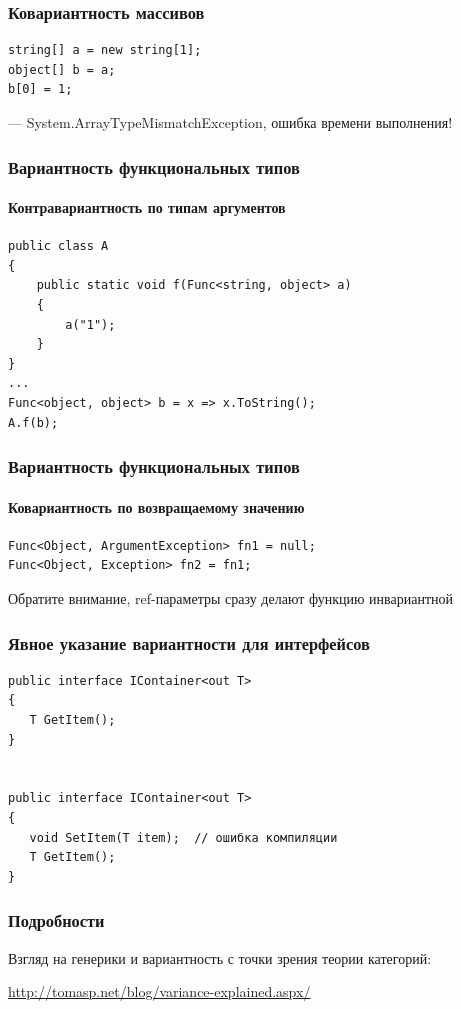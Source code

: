 \documentclass[xetex,mathserif,serif]{beamer}
\begin{document}
	\begin{frame}[fragile]
		\frametitle{Ковариантность массивов}
		\begin{verbatim}
string[] a = new string[1];
object[] b = a;
b[0] = 1;
		\end{verbatim}
		--- System.ArrayTypeMismatchException, ошибка времени выполнения!
	\end{frame}

	\begin{frame}[fragile]
		\frametitle{Вариантность функциональных типов}
		\framesubtitle{Контравариантность по типам аргументов}
		\begin{verbatim}
public class A
{
    public static void f(Func<string, object> a)
    {
        a("1");
    }
}
...
Func<object, object> b = x => x.ToString();
A.f(b);
		\end{verbatim}
	\end{frame}

	\begin{frame}[fragile]
		\frametitle{Вариантность функциональных типов}
		\framesubtitle{Ковариантность по возвращаемому значению}
		\begin{verbatim}
Func<Object, ArgumentException> fn1 = null;
Func<Object, Exception> fn2 = fn1;
		\end{verbatim}

		Обратите внимание, ref-параметры сразу делают функцию инвариантной
	\end{frame}

	\begin{frame}[fragile]
		\frametitle{Явное указание вариантности для интерфейсов}
		\begin{verbatim}
public interface IContainer<out T>
{
   T GetItem();
}


public interface IContainer<out T>
{
   void SetItem(T item);  // ошибка компиляции
   T GetItem();
}
		\end{verbatim}
	\end{frame}

	\begin{frame}
		\frametitle{Подробности}
		Взгляд на генерики и вариантность с точки зрения теории категорий:

		\href{http://tomasp.net/blog/variance-explained.aspx/}{http://tomasp.net/blog/variance-explained.aspx/}
	\end{frame}
\end{document}
